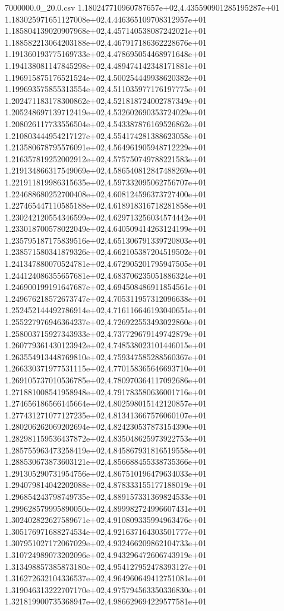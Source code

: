 \begin{filecontents*}{7000000.0_20.0.csv}
1.180247710960787657e+02,4.435590901285195287e+01
1.183025971651127008e+02,4.446365109708312957e+01
1.185804139020907968e+02,4.457140538087242021e+01
1.188582213064203188e+02,4.467917186362228676e+01
1.191360193775169733e+02,4.478695054468971648e+01
1.194138081147845298e+02,4.489474142348171881e+01
1.196915875176521524e+02,4.500254449938620382e+01
1.199693575855313554e+02,4.511035977176197775e+01
1.202471183178300862e+02,4.521818724002787349e+01
1.205248697139712419e+02,4.532602690353724029e+01
1.208026117733556504e+02,4.543387876169526862e+01
1.210803444954217127e+02,4.554174281388623058e+01
1.213580678795576091e+02,4.564961905948712229e+01
1.216357819252002912e+02,4.575750749788221583e+01
1.219134866317549069e+02,4.586540812847488269e+01
1.221911819986315635e+02,4.597332095062756707e+01
1.224688680252700408e+02,4.608124596373727400e+01
1.227465447110585188e+02,4.618918316718281858e+01
1.230242120554346599e+02,4.629713256034574442e+01
1.233018700578022049e+02,4.640509414263124199e+01
1.235795187175839516e+02,4.651306791339720803e+01
1.238571580341879326e+02,4.662105387204519502e+01
1.241347880070524781e+02,4.672905201795947505e+01
1.244124086355657681e+02,4.683706235051886324e+01
1.246900199191647687e+02,4.694508486911854561e+01
1.249676218572673747e+02,4.705311957312096638e+01
1.252452144492786914e+02,4.716116646193040651e+01
1.255227976946364237e+02,4.726922553493022860e+01
1.258003715927343933e+02,4.737729679149742879e+01
1.260779361430123942e+02,4.748538023101446015e+01
1.263554913448769810e+02,4.759347585288560367e+01
1.266330371977531115e+02,4.770158365646693710e+01
1.269105737010536785e+02,4.780970364117092686e+01
1.271881008541958948e+02,4.791783580636001716e+01
1.274656186566145664e+02,4.802598015142120857e+01
1.277431271077127235e+02,4.813413667576060107e+01
1.280206262069202694e+02,4.824230537873154390e+01
1.282981159536437872e+02,4.835048625973922753e+01
1.285755963473258419e+02,4.845867931816519558e+01
1.288530673873603121e+02,4.856688455338735366e+01
1.291305290731954756e+02,4.867510196479634033e+01
1.294079814042202088e+02,4.878333155177188019e+01
1.296854243798749735e+02,4.889157331369824533e+01
1.299628579995890050e+02,4.899982724996607431e+01
1.302402822627589671e+02,4.910809335994963476e+01
1.305176971688274534e+02,4.921637164303501777e+01
1.307951027172067029e+02,4.932466209862104733e+01
1.310724989073202096e+02,4.943296472606743919e+01
1.313498857385873180e+02,4.954127952478393127e+01
1.316272632104336537e+02,4.964960649412751081e+01
1.319046313222707170e+02,4.975794563350336830e+01
1.321819900735368947e+02,4.986629694229577581e+01

\end{filecontents*}
